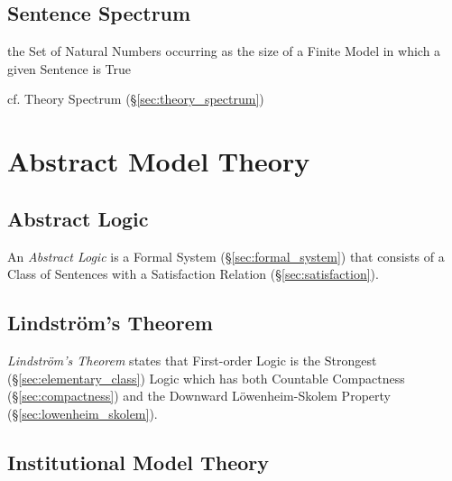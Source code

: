 \subsection{Sentence Spectrum}\label{sec:sentence_spectrum}

the Set of Natural Numbers occurring as the size of a Finite Model in which a
given Sentence is True

cf. Theory Spectrum (\S\ref{sec:theory_spectrum})



\section{Abstract Model Theory}\label{sec:abstract_model}

\subsection{Abstract Logic}\label{sec:abstract_logic}

An \emph{Abstract Logic} is a Formal System
(\S\ref{sec:formal_system}) that consists of a Class of Sentences with
a Satisfaction Relation (\S\ref{sec:satisfaction}).



\subsection{Lindstr\"om's Theorem}\label{sec:lindstroms_theorem}

\emph{Lindstr\"om's Theorem} states that First-order Logic is the
Strongest (\S\ref{sec:elementary_class}) Logic which has both
Countable Compactness (\S\ref{sec:compactness}) and the Downward
L\"owenheim-Skolem Property (\S\ref{sec:lowenheim_skolem}).



\subsection{Institutional Model Theory}\label{sec:institutional_model}

